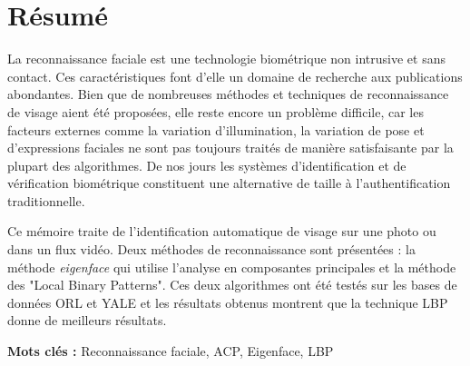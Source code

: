 \chapter*{Résumé}

 La reconnaissance faciale est une technologie biométrique non intrusive et sans contact. Ces caractéristiques font d'elle un domaine de recherche aux publications abondantes. Bien que de nombreuses méthodes et techniques de reconnaissance de visage aient été proposées, elle reste encore un problème difficile, car les facteurs externes comme la variation d'illumination, la variation de pose et d'expressions faciales ne sont pas toujours traités de manière satisfaisante par la plupart des algorithmes. De nos jours les systèmes d'identification et de vérification biométrique constituent une alternative de taille à l'authentification traditionnelle.

Ce mémoire traite de l'identification automatique de visage sur une photo ou dans un flux vidéo. Deux méthodes de reconnaissance sont présentées : la méthode \textit{eigenface} qui utilise l'analyse en composantes principales et la méthode des "Local Binary Patterns". Ces deux algorithmes ont été testés sur les bases de données ORL et YALE et les résultats obtenus montrent que la technique LBP donne de meilleurs résultats.
 
\vspace{20pt}
\textbf{Mots clés :} Reconnaissance faciale, ACP, Eigenface, LBP